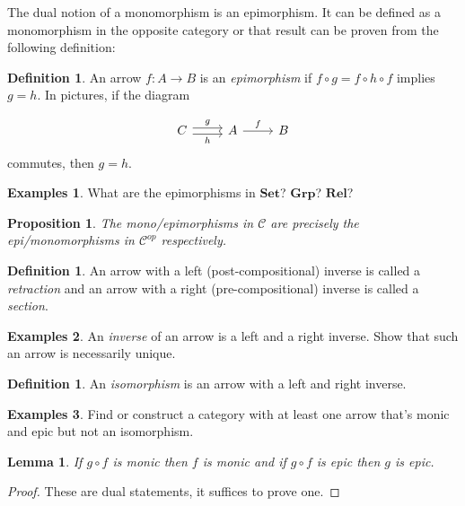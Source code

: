 \documentclass[11pt]{amsart}
\theoremstyle{plain}
\newtheorem{prop}[thm]{Proposition}
\newtheorem{lem}[thm]{Lemma}
\theoremstyle{definition}
\newtheorem{defn}[thm]{Definition}
\newtheorem*{egs*}{Examples}
\newcommand{\cC}{{\mathcal C}}
\newcommand{\Rel}{\mathbf{Rel}}
\newcommand{\Set}{{\mathbf{Set}}}
\newcommand{\Grp}{\mathbf{Grp}}
\newcommand{\noi}{{\noindent}}
\begin{document}
\noi The dual notion of a monomorphism is an epimorphism. It can be defined as a monomorphism in the opposite category or that result can be proven from the following definition: 

\begin{defn}
An arrow $f : A \to B$ is an \textit{epimorphism} if $f \circ g = f \circ h \circ f$ implies $g = h$. In pictures, if the diagram

\[ \begin{tikzcd}
  C \rar[shift left, "g"] \rar[shift right, "h"'] & A \rar["f"] & B 
\end{tikzcd}\]
\noi commutes, then $g = h$. 
\end{defn}

\begin{egs*}
  What are the epimorphisms in $\Set$? $\Grp$? $\Rel$?  
\end{egs*}

\begin{prop}
The mono/epimorphisms in $\cC$ are precisely the epi/monomorphisms in $\cC^{op}$ respectively. 
\end{prop}

\begin{defn}
An arrow with a left (post-compositional) inverse is called a \textit{retraction} and an arrow with a right (pre-compositional) inverse is called a \textit{section}. 
\end{defn}

\begin{egs*}
An \textit{inverse} of an arrow is a left and a right inverse. Show that such an arrow is necessarily unique. 
\end{egs*}

\begin{defn}
An \textit{isomorphism} is an arrow with a left and right inverse. 
\end{defn}

\begin{egs*}
Find or construct a category with at least one arrow that's monic and epic but not an isomorphism. 
\end{egs*}

\begin{lem}
If $g \circ f$ is monic then $f$ is monic and if $g \circ f$ is epic then $g$ is epic. 
\end{lem}
\begin{proof}
These are dual statements, it suffices to prove one.
\end{proof}
\end{document}
